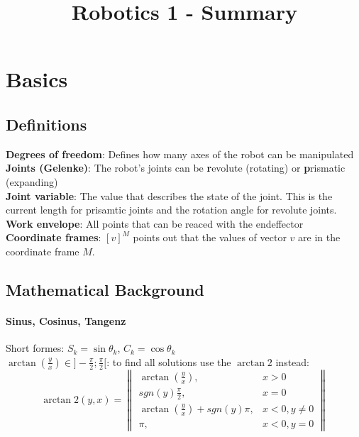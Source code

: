 \documentclass{article}
\begin{document}
	\title{Robotics 1 - Summary}
	\maketitle
	
	\newpage
	
	\tableofcontents
	
	\newpage
	
	\section{Basics}
	\subsection{Definitions}
	\textbf{Degrees of freedom}: Defines how many axes of the robot can be manipulated\\
	\textbf{Joints (Gelenke)}: The robot's joints can be \textbf{r}evolute (rotating) or \textbf{p}rismatic (expanding)\\
	\textbf{Joint variable}: The value that describes the state of the joint. This is the current length for prisamtic joints and the rotation angle for revolute joints.\\
	\textbf{Work envelope}: All points that can be reaced with the endeffector\\
	\textbf{Coordinate frames}: $[v]^M$ points out that the values of vector $v$ are in the coordinate frame $M$.
	
	\subsection{Mathematical Background}
	\paragraph{Sinus, Cosinus, Tangenz}
	Short formes: $S_{k} = \sin \theta_{k}$, $C_{k} = \cos \theta_{k}$\\
	$\arctan(\frac{y}{x}) \in ]-\frac{\pi}{2};\frac{\pi}{2}[$: to find all solutions use the $\arctan2$ instead:
	\begin{equation}
	\arctan2(y,x) = 
	\begin{Vmatrix} %
	\arctan(\frac{y}{x}), & x > 0\\
	sgn(y)\frac{\pi}{2}, & x = 0\\
	\arctan(\frac{y}{x}) + sgn(y)\pi, & x < 0, y \neq 0\\
	\pi, & x < 0, y = 0
	\end{Vmatrix}
	\end{equation}
	
\end{document}
